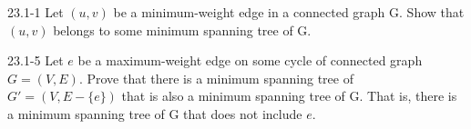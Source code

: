 \begin{problem}{23.1-1}
  Let $(u,v)$ be a minimum-weight edge in a connected graph G. Show that $(u,v)$ belongs to some minimum spanning tree
  of G.
\end{problem}

\begin{problem}{23.1-5}
  Let $e$ be a maximum-weight edge on some cycle of connected graph $G = (V,E)$. Prove that there is a minimum spanning
  tree of $G' = (V,E - \{e\})$ that is also a minimum spanning tree of G. That is, there is a minimum spanning tree of G
  that does not include $e$.
\end{problem}



